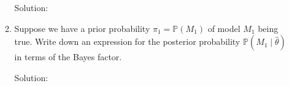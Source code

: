 \documentclass[letterpaper,11pt]{article}
\begin{document}
\begin{enumerate}
\begin{enumerate}
    \begin{description}
    \item[Solution:] 
    \end{description}
  \item Suppose we have a prior probability $\pi_1 = \mathbb{P}\left(M_1\right)$
    of model $M_1$ being true. Write down an expression for the posterior
    probability $\mathbb{P}\left(M_1 \mid \hat{\theta}\right)$ in terms of the
    Bayes factor.
    \begin{description}
    \item[Solution:] 
    \end{description}
  \end{enumerate}
\end{enumerate}
\end{document}
